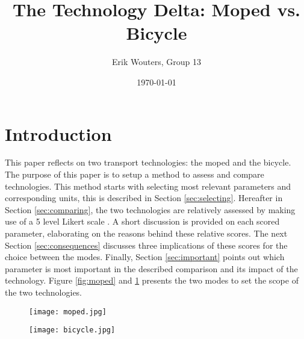 \documentclass[a4paper]{article}
\title{The Technology Delta: Moped vs. Bicycle}
\author{Erik Wouters, Group 13}
\date{\today}
\begin{document}
\maketitle


\section{Introduction}
\label{sec:introduction}
This paper reflects on two transport technologies: the moped and the bicycle. The purpose of this paper is to setup a method to assess and compare technologies. This method starts with selecting most relevant parameters and corresponding units, this is described in Section \ref{sec:selecting}. Hereafter in Section \ref{sec:comparing}, the two technologies are relatively assessed by making use of a 5 level Likert scale \cite{likert}. A short discussion is provided on each scored parameter, elaborating on the reasons behind these relative scores. The next Section \ref{sec:consequences} discusses three implications of these scores for the choice between the modes. Finally, Section \ref{sec:important} points out which parameter is most important in the described comparison and its impact of the technology. Figure \ref{fig:moped} and \ref{fig:bicycle} presents the two modes to set the scope of the two technologies.


\begin{figure}[h]
\centering
\begin{minipage}{.5\textwidth}
  \centering
  \texttt{[image: moped.jpg]}
  \label{fig:moped}
\end{minipage}%
\begin{minipage}{.5\textwidth}
  \centering
  \texttt{[image: bicycle.jpg]}
  \label{fig:bicycle}
\end{minipage}
\end{figure}
\end{document}
